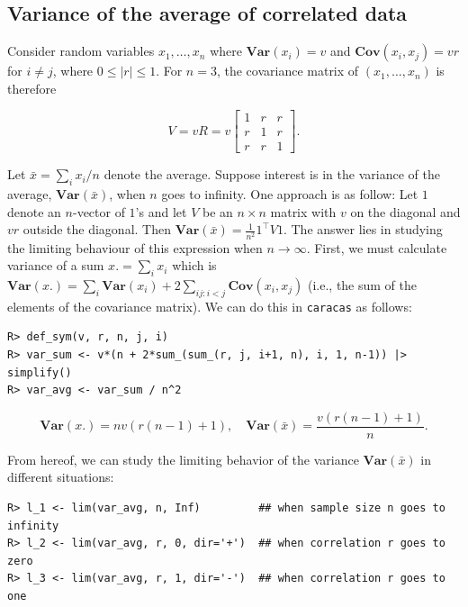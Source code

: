 \hypertarget{variance-of-the-average-of-correlated-data}{%
\subsection{Variance of the average of correlated data}\label{variance-of-the-average-of-correlated-data}}

Consider random
variables \(x_1,\dots, x_n\) where \(\mathbf{Var}(x_i)=v\) and \(\mathbf{Cov}(x_i, x_j)=v r\) for \(i\not = j\), where \(0 \le |r| \le1\).
For \(n=3\), the covariance matrix of \((x_1,\dots, x_n)\) is therefore

\begin{equation}
  \label{eq:1}
  V = v R = v \left[\begin{matrix}1 & r & r\\r & 1 & r\\r & r & 1\end{matrix}\right]. 
\end{equation}

Let \(\bar x = \sum_i x_i / n\) denote the average. Suppose interest is
in the variance of the average, \(\mathbf{Var}(\bar x)\), when \(n\) goes to
infinity. One approach is as follow: Let \(1\) denote an \(n\)-vector of
\(1\)'s and let \(V\) be an \(n \times n\) matrix with \(v\) on the diagonal
and \(v r\) outside the diagonal. Then \(\mathbf{Var}(\bar x)=\frac 1 {n^2} 1^\top V 1\). The answer lies in studying the limiting behaviour of
this expression when \(n \rightarrow \infty\).
First, we must calculate variance of a sum \(x. = \sum_i x_i\)
which is \(\mathbf{Var}(x.) = \sum_i \mathbf{Var}(x_i) + 2 \sum_{ij:i<j} \mathbf{Cov}(x_i, x_j)\) (i.e., the sum of the elements of the covariance matrix).
We can do this in \texttt{caracas} as follows:

\begin{verbatim}
R> def_sym(v, r, n, j, i) 
R> var_sum <- v*(n + 2*sum_(sum_(r, j, i+1, n), i, 1, n-1)) |> simplify()
R> var_avg <- var_sum / n^2
\end{verbatim}

\[
\mathbf{Var}(x.) = n v \left(r \left(n - 1\right) + 1\right),
\quad
\mathbf{Var}(\bar x) = \frac{v \left(r \left(n - 1\right) + 1\right)}{n}.
\]

From hereof, we can study the limiting behavior of the variance
\(\mathbf{Var}(\bar x)\) in different situations:

\begin{verbatim}
R> l_1 <- lim(var_avg, n, Inf)         ## when sample size n goes to infinity
R> l_2 <- lim(var_avg, r, 0, dir='+')  ## when correlation r goes to zero
R> l_3 <- lim(var_avg, r, 1, dir='-')  ## when correlation r goes to one
\end{verbatim}

